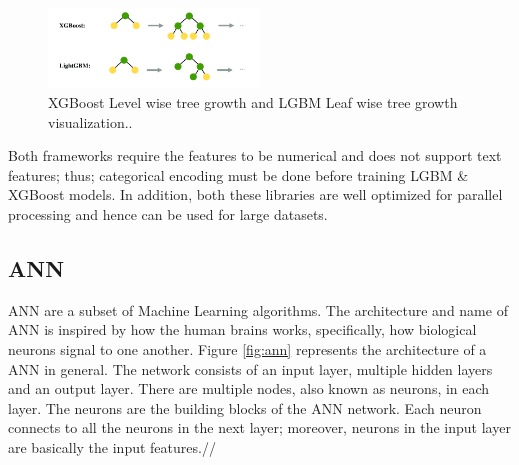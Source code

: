 \documentclass[twoside,11pt,a4paper]{article}
\begin{document}
\begin{figure}[ht]
	\centering
	\includegraphics[width=0.5\textwidth]{lgbm_xgboost_tree_growth}
	\caption[\acs{XGBoost} Level wise tree growth and \acs{LGBM} Leaf wise tree growth visualization.]{\acs{XGBoost} Level wise tree growth and \acs{LGBM} Leaf wise tree growth visualization.\cite{rezazadeh2020generalized}.}
	\label{fig:lgbm_xgboost_tree_growth}
\end{figure}
\FloatBarrier
Both frameworks require the features to be numerical and does not support text features; thus; categorical encoding must be done before training \acs{LGBM} \& \acs{XGBoost} models.
In addition, both these libraries are well optimized for parallel processing and hence can be used for large datasets.

\subsection{\acf{ANN}}
\acs{ANN} are a subset of Machine Learning algorithms. The  architecture and name of \acs{ANN} is inspired by how the human brains works, specifically, how biological neurons signal to one another\citep{ibm2022neural}. Figure \ref{fig:ann} represents the architecture of a \acs{ANN} in general. The network consists of an input layer, multiple hidden layers and an output layer. There are multiple nodes, also known as neurons, in each layer. The neurons are the building blocks of the \acs{ANN} network. Each neuron connects to all the neurons in the next layer; moreover, neurons in the input layer are basically the input features.//
\end{document}
